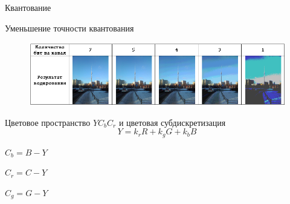 \documentclass[11pt]{beamer}
\begin{document}
\begin{frame}{Квантование}
\begin{block}{Уменьшение точности квантования}
\begin{figure}[H]
	\begin{center}
		\includegraphics[scale=0.48]{../pics/quantization/quantization.png}
	\end{center}
\end{figure}	
\end{block}				
\end{frame}



\begin{frame}{Цветовое пространство $YC_bC_r$ и цветовая субдискретизация}
	\begin{displaymath}
		Y = k_rR + k_gG + k_bB
	\end{displaymath}
	
	\begin{center}
		$C_b = B - Y$ 
		
		$C_r = C - Y$ 
		
		$C_g = G - Y$ 
	\end{center}			
\end{frame}
\end{document}
